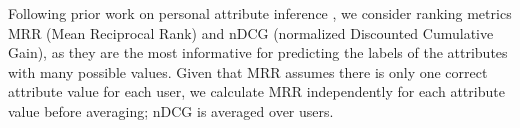  Following prior work on personal attribute inference \cite{tigunova:ham:2019,pietro:ACL15}, we consider ranking metrics MRR (Mean Reciprocal Rank) and nDCG (normalized Discounted Cumulative Gain), as they are the most informative for predicting the labels of the attributes with many possible values.
Given that MRR assumes there is only one correct attribute value for each user, we calculate MRR independently for each attribute value before averaging; nDCG is averaged over users.

